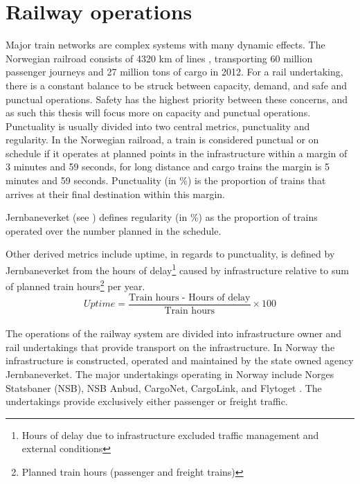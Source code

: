 
\section{Railway operations} %
\label{sec:railway_operations}
Major train networks are complex systems with many dynamic effects. The 
Norwegian railroad consists of 4320 km of lines \cite[p. 4]{jernbaneverketStatistikk}, transporting 60 million passenger journeys and 27 
million tons of cargo in 2012\cite[p. 9]{jernbaneverketStatistikk}. For a rail 
undertaking, there is a constant balance to be struck between capacity, demand, 
and safe and punctual operations. Safety has the highest priority between 
these concerns, and as such this thesis will focus more on capacity and 
punctual operations.\\

Punctuality is usually divided into two central metrics, punctuality and 
regularity. In the Norwegian railroad, a train is considered punctual or on 
schedule if it operates at planned points in the infrastructure within a 
margin of 3 minutes and 59 seconds, for long distance and cargo trains the 
margin is 5 minutes and 59 seconds. Punctuality (in \%) is the proportion of 
trains that arrives at their final destination within this margin.

Jernbaneverket (see ) defines regularity (in \%) as the proportion of trains operated over the number planned in the schedule. 

Other derived metrics include uptime, in regards to punctuality, is defined by 
Jernbaneverket from 
the hours of delay\footnote{Hours of delay due to infrastructure excluded 
traffic	management and external conditions} caused by infrastructure relative 
to sum of planned train hours\footnote{Planned train hours (passenger and freight
trains)} per year.\cite{jernbaneverketPunklighetsTall}
\begin{equation} Uptime =
		\frac
				{
					\text{Train hours - Hours of delay}
				}
				{
					\text{Train hours}
				}\times 100 
\end{equation}\\

The operations of the railway system are divided into infrastructure owner and 
rail undertakings that provide transport on the infrastructure. In Norway the 
infrastructure is constructed, operated and maintained by the state owned 
agency Jernbaneverket. The major undertakings operating in Norway  include 
Norges Statsbaner (NSB), NSB Anbud, CargoNet, CargoLink, and Flytoget \cite{ wiki:NorwegianRailway}. The undertakings provide exclusively either passenger 
or freight traffic.\\

